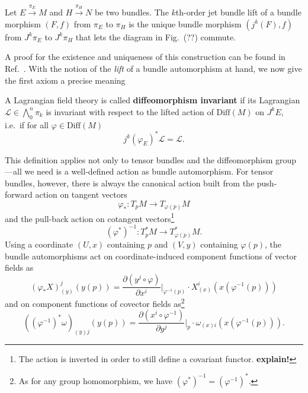 \begin{definition}
  Let $E \overset{\pi_E}{\longrightarrow} M$ and $H \overset{\pi_H}{\longrightarrow} N$ be two bundles. The $k$th-order jet bundle lift of a bundle morphism $(F,f)$ from $\pi_E$ to $\pi_H$ is the unique bundle morphism $(j^k(F),f)$ from $J^k\pi_E$ to $J^k\pi_H$ that lets the diagram in Fig.~(??) commute.
\end{definition}
A proof for the existence and uniqueness of this construction can be found in Ref.~\cite{saunders}. With the notion of the \emph{lift} of a bundle automorphism at hand, we now give the first axiom a precise meaning
\begin{definition}
  A Lagrangian field theory is called \textbf{diffeomorphism invariant} if its Lagrangian $\mathcal L\in\textstyle\bigwedge_0^n\pi_k$ is invariant with respect to the lifted action of $\mathrm{Diff}(M)$ on $J^kE$, i.e.~if for all $\varphi\in\mathrm{Diff}(M)$
  \begin{equation}\label{lagrangian_diffeo_invariance}
    j^k(\varphi_E)^\ast \mathcal L = \mathcal L.
  \end{equation}
\end{definition}
This definition applies not only to tensor bundles and the diffeomorphism group---all we need is a well-defined action as bundle automorphism. For tensor bundles, however, there is always the canonical action built from the push-forward action on tangent vectors
\begin{equation}
  \varphi_\ast\colon T_pM\rightarrow T_{\varphi(p)}M
\end{equation}
and the pull-back action on cotangent vectors\footnote{The action is inverted in order to still define a covariant functor. \textbf{explain!}\cite{}}
\begin{equation}
   (\varphi^\ast)^{-1}\colon T^\ast_pM\rightarrow T^\ast_{\varphi(p)}M.
\end{equation}
Using a coordinate $(U,x)$ containing $p$ and $(V,y)$ containing $\varphi(p)$, the bundle automorphisms act on coordinate-induced component functions of vector fields as
\begin{equation}\label{diffeo_vector_coordinates}
(\varphi_\ast X)_{(y)}^j(y(p)) = \frac{\partial (y^j\circ \varphi)}{\partial x^i} \Bigg\rvert_{\varphi^{-1}(p)} \cdot X_{(x)}^i(x(\varphi^{-1}(p)))
\end{equation}
and on component functions of covector fields as\footnote{As for any group homomorphism, we have $(\varphi^\ast)^{-1}=(\varphi^{-1})^\ast$.}
\begin{equation}\label{diffeo_covector_coordinates}
((\varphi^{-1})^\ast\omega)_{(y)j}(y(p)) = \frac{\partial (x^i\circ \varphi^{-1})}{\partial y^j}\Bigg\rvert_p \cdot \omega_{(x)i}(x(\varphi^{-1}(p))).
\end{equation}

